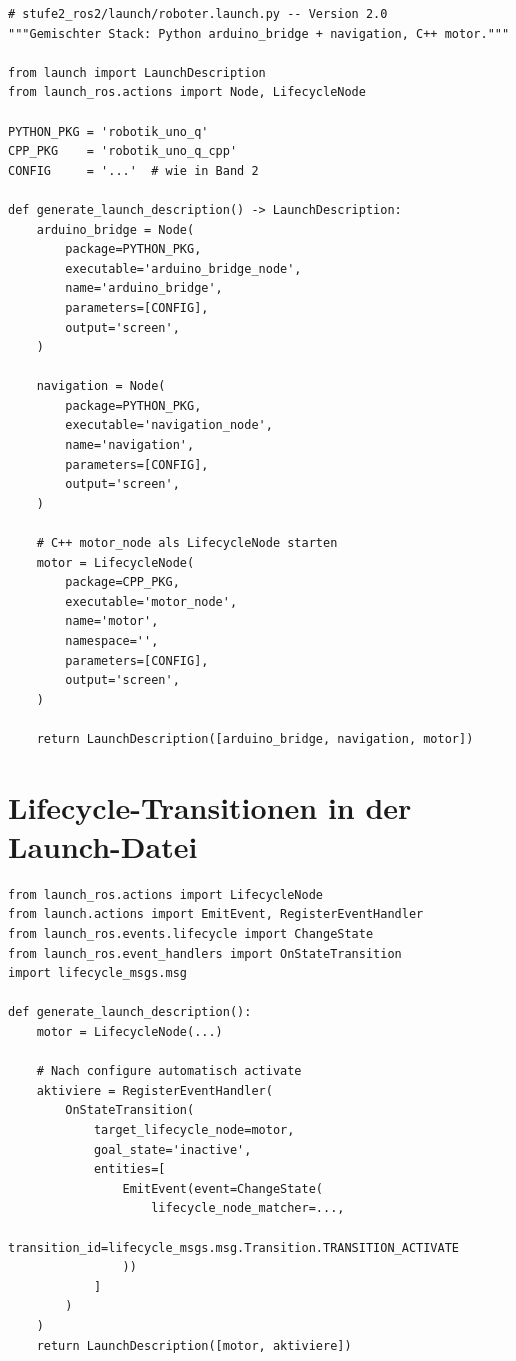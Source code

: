 \begin{lstlisting}
# stufe2_ros2/launch/roboter.launch.py -- Version 2.0
"""Gemischter Stack: Python arduino_bridge + navigation, C++ motor."""

from launch import LaunchDescription
from launch_ros.actions import Node, LifecycleNode

PYTHON_PKG = 'robotik_uno_q'
CPP_PKG    = 'robotik_uno_q_cpp'
CONFIG     = '...'  # wie in Band 2

def generate_launch_description() -> LaunchDescription:
    arduino_bridge = Node(
        package=PYTHON_PKG,
        executable='arduino_bridge_node',
        name='arduino_bridge',
        parameters=[CONFIG],
        output='screen',
    )

    navigation = Node(
        package=PYTHON_PKG,
        executable='navigation_node',
        name='navigation',
        parameters=[CONFIG],
        output='screen',
    )

    # C++ motor_node als LifecycleNode starten
    motor = LifecycleNode(
        package=CPP_PKG,
        executable='motor_node',
        name='motor',
        namespace='',
        parameters=[CONFIG],
        output='screen',
    )

    return LaunchDescription([arduino_bridge, navigation, motor])
\end{lstlisting}

\section{Lifecycle-Transitionen in der Launch-Datei}

\begin{lstlisting}
from launch_ros.actions import LifecycleNode
from launch.actions import EmitEvent, RegisterEventHandler
from launch_ros.events.lifecycle import ChangeState
from launch_ros.event_handlers import OnStateTransition
import lifecycle_msgs.msg

def generate_launch_description():
    motor = LifecycleNode(...)

    # Nach configure automatisch activate
    aktiviere = RegisterEventHandler(
        OnStateTransition(
            target_lifecycle_node=motor,
            goal_state='inactive',
            entities=[
                EmitEvent(event=ChangeState(
                    lifecycle_node_matcher=...,
                    transition_id=lifecycle_msgs.msg.Transition.TRANSITION_ACTIVATE
                ))
            ]
        )
    )
    return LaunchDescription([motor, aktiviere])
\end{lstlisting}

